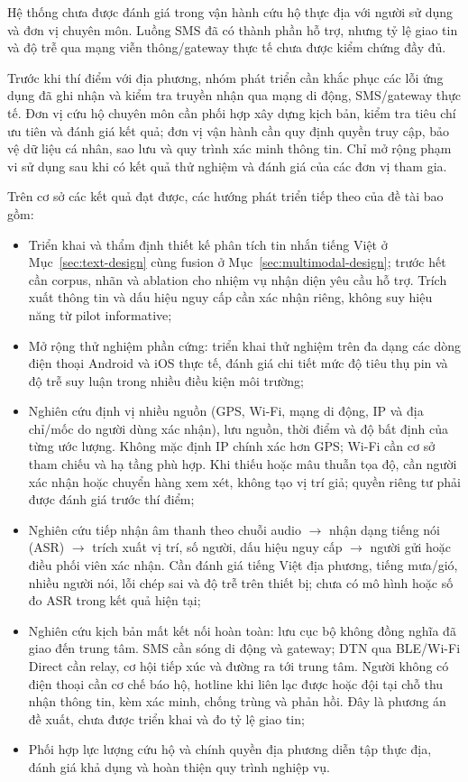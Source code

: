Hệ thống chưa được đánh giá trong vận hành cứu hộ thực địa với người sử dụng và đơn vị chuyên môn. Luồng SMS đã có thành phần hỗ trợ, nhưng tỷ lệ giao tin và độ trễ qua mạng viễn thông/gateway thực tế chưa được kiểm chứng đầy đủ.

Trước khi thí điểm với địa phương, nhóm phát triển cần khắc phục các lỗi ứng dụng đã ghi nhận và kiểm tra truyền nhận qua mạng di động, SMS/gateway thực tế. Đơn vị cứu hộ chuyên môn cần phối hợp xây dựng kịch bản, kiểm tra tiêu chí ưu tiên và đánh giá kết quả; đơn vị vận hành cần quy định quyền truy cập, bảo vệ dữ liệu cá nhân, sao lưu và quy trình xác minh thông tin. Chỉ mở rộng phạm vi sử dụng sau khi có kết quả thử nghiệm và đánh giá của các đơn vị tham gia.

Trên cơ sở các kết quả đạt được, các hướng phát triển tiếp theo của đề tài bao gồm:
\begin{itemize}
\item Triển khai và thẩm định thiết kế phân tích tin nhắn tiếng Việt ở Mục~\ref{sec:text-design} cùng fusion ở Mục~\ref{sec:multimodal-design}; trước hết cần corpus, nhãn và ablation cho nhiệm vụ nhận diện yêu cầu hỗ trợ. Trích xuất thông tin và dấu hiệu nguy cấp cần xác nhận riêng, không suy hiệu năng từ pilot informative;
\item Mở rộng thử nghiệm phần cứng: triển khai thử nghiệm trên đa dạng các dòng điện thoại Android và iOS thực tế, đánh giá chi tiết mức độ tiêu thụ pin và độ trễ suy luận trong nhiều điều kiện môi trường;
\item Nghiên cứu định vị nhiều nguồn (GPS, Wi-Fi, mạng di động, IP và địa chỉ/mốc do người dùng xác nhận), lưu nguồn, thời điểm và độ bất định của từng ước lượng. Không mặc định IP chính xác hơn GPS; Wi-Fi cần cơ sở tham chiếu và hạ tầng phù hợp. Khi thiếu hoặc mâu thuẫn tọa độ, cần người xác nhận hoặc chuyển hàng xem xét, không tạo vị trí giả; quyền riêng tư phải được đánh giá trước thí điểm;
\item Nghiên cứu tiếp nhận âm thanh theo chuỗi audio $\rightarrow$ nhận dạng tiếng nói (ASR) $\rightarrow$ trích xuất vị trí, số người, dấu hiệu nguy cấp $\rightarrow$ người gửi hoặc điều phối viên xác nhận. Cần đánh giá tiếng Việt địa phương, tiếng mưa/gió, nhiều người nói, lỗi chép sai và độ trễ trên thiết bị; chưa có mô hình hoặc số đo ASR trong kết quả hiện tại;
\item Nghiên cứu kịch bản mất kết nối hoàn toàn: lưu cục bộ không đồng nghĩa đã giao đến trung tâm. SMS cần sóng di động và gateway; DTN qua BLE/Wi-Fi Direct cần relay, cơ hội tiếp xúc và đường ra tới trung tâm. Người không có điện thoại cần cơ chế báo hộ, hotline khi liên lạc được hoặc đội tại chỗ thu nhận thông tin, kèm xác minh, chống trùng và phản hồi. Đây là phương án đề xuất, chưa được triển khai và đo tỷ lệ giao tin;
\item Phối hợp lực lượng cứu hộ và chính quyền địa phương diễn tập thực địa, đánh giá khả dụng và hoàn thiện quy trình nghiệp vụ.
\end{itemize}
